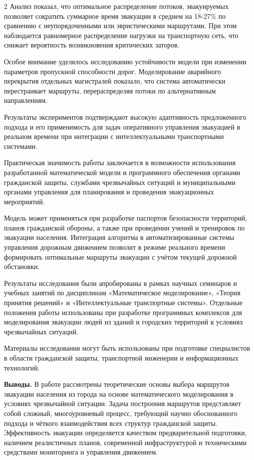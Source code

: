 \begin{multicols}{2}
Анализ показал, что оптимальное распределение потоков, эвакуируемых
позволяет сократить суммарное время эвакуации в среднем на 18-27\% по
сравнению с неупорядоченными или эвристическими маршрутами. При этом
наблюдается равномерное распределение нагрузки на транспортную сеть, что
снижает вероятность возникновения критических заторов.

Особое внимание уделялось исследованию устойчивости модели при изменении
параметров пропускной способности дорог. Моделирование аварийного
перекрытия отдельных магистралей показало, что система автоматически
перестраивает маршруты, перераспределяя потоки по альтернативным
направлениям.

Результаты экспериментов подтверждают высокую адаптивность предложенного
подхода и его применимость для задач оперативного управления эвакуацией
в реальном времени при интеграции с интеллектуальными транспортными
системами.

Практическая значимость работы заключается в возможности использования
разработанной математической модели и программного обеспечения органами
гражданской защиты, службами чрезвычайных ситуаций и муниципальными
органами управления для планирования и проведения эвакуационных
мероприятий.

Модель может применяться при разработке паспортов безопасности
территорий, планов гражданской обороны, а также при проведении учений и
тренировок по эвакуации населения. Интеграция алгоритма в
автоматизированные системы управления дорожным движением позволит в
режиме реального времени формировать оптимальные маршруты эвакуации с
учётом текущей дорожной обстановки.

Результаты исследования были апробированы в рамках научных семинаров и
учебных занятий по дисциплинам «Математическое моделирование», «Теория
принятия решений» и «Интеллектуальные транспортные системы». Отдельные
положения работы использованы при разработке программных комплексов для
моделирования эвакуации людей из зданий и городских территорий в
условиях чрезвычайных ситуаций.

Материалы исследования могут быть использованы при подготовке
специалистов в области гражданской защиты, транспортной инженерии и
информационных технологий.

{\bfseries Выводы.} В работе рассмотрены теоретические основы выбора
маршрутов эвакуации населения из города на основе математического
моделирования в условиях чрезвычайной ситуации. Задача построения
маршрутов представляет собой сложный, многоуровневый процесс, требующий
научно обоснованного подхода и чёткого взаимодействия всех структур
гражданской защиты. Эффективность эвакуации определяется качеством
предварительной подготовки, наличием реалистичных планов, современной
инфраструктурой и техническими средствами мониторинга и управления
движением.


\end{multicols}
